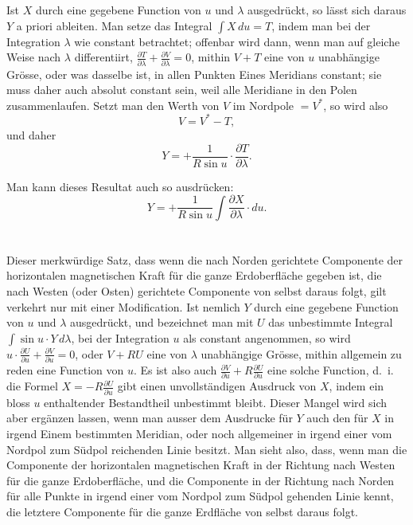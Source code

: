 \documentclass[fontsize=11pt,paper=a4,twoside,openany]{scrbook}
\begin{document}
\section{}

Ist $X$ durch eine gegebene Function von $u$ und $\lambda$ ausgedrückt, so lässt sich daraus $Y$ a priori ableiten. Man setze das Integral $\int X\,du = T$, indem man bei der Integration $\lambda$ wie constant betrachtet; offenbar wird dann, wenn man auf gleiche Weise nach $\lambda$ differentiirt, $\frac{\partial T}{\partial \lambda} + \frac{\partial V}{\partial \lambda} = 0$, mithin $V+T$ eine von $u$ unabhängige Grösse, oder was dasselbe ist, in allen Punkten Eines Meridians constant; sie muss daher auch absolut constant sein, weil alle Meridiane in den Polen zusammenlaufen. Setzt man den Werth von $V$ im Nordpole $=V^{*}$, so wird also
\[
V = V^{*} - T,
\]
und daher
\[
Y = +\frac{1}{R\sin u}\cdot\frac{\partial T}{\partial \lambda}.
\]

Man kann dieses Resultat auch so ausdrücken:
\[
Y = +\frac{1}{R\sin u}\int\frac{\partial X}{\partial \lambda}\cdot du.
\]

\section{}

Dieser merkwürdige Satz, dass wenn die nach Norden gerichtete Componente der horizontalen magnetischen Kraft für die ganze Erdoberfläche gegeben ist, die nach Westen (oder Osten) gerichtete Componente von selbst daraus folgt, gilt verkehrt nur mit einer Modification. Ist nemlich $Y$ durch eine gegebene Function von $u$ und $\lambda$ ausgedrückt, und bezeichnet man mit $U$ das unbestimmte Integral $\int\sin u\cdot Y\,d\lambda$, bei der Integration $u$ als constant angenommen, so wird $u\cdot\frac{\partial U}{\partial u}+\frac{\partial V}{\partial u}=0$, oder $V+RU$ eine von $\lambda$ unabhängige Grösse, mithin allgemein zu reden eine Function von $u$. Es ist also auch $\frac{\partial V}{\partial u}+R\frac{\partial U}{\partial u}$ eine solche Function, d.~i. die Formel $X=-R\frac{\partial U}{\partial u}$ gibt einen unvollständigen Ausdruck von $X$, indem ein bloss $u$ enthaltender Bestandtheil unbestimmt bleibt. Dieser Mangel wird sich aber ergänzen lassen, wenn man ausser dem Ausdrucke für $Y$ auch den für $X$ in irgend Einem bestimmten Meridian, oder noch allgemeiner in irgend einer vom Nordpol zum Südpol reichenden Linie besitzt. Man sieht also, dass, wenn man die Componente der horizontalen magnetischen Kraft in der Richtung nach Westen für die ganze Erdoberfläche, und die Componente in der Richtung nach Norden für alle Punkte in irgend einer vom Nordpol zum Südpol gehenden Linie kennt, die letztere Componente für die ganze Erdfläche von selbst daraus folgt.
\end{document}
